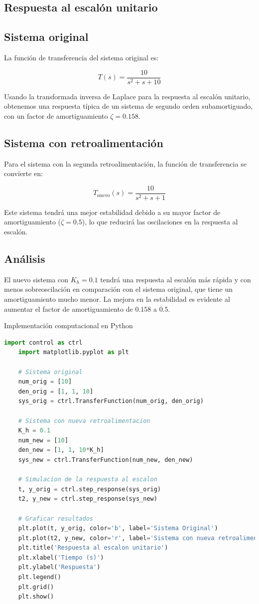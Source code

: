 \documentclass[10pt]{article}
\theoremstyle{definition}
\theoremstyle{remark}
\theoremstyle{definition}
\numberwithin{equation}{prob}
\begin{document}
\subsection{Respuesta al escalón unitario}

\subsection*{Sistema original}

La función de transferencia del sistema original es:

\[
	T(s) = \frac{10}{s^2 + s + 10}
\]

Usando la transformada inversa de Laplace para la respuesta al escalón unitario, obtenemos una respuesta típica de un sistema de segundo orden subamortiguado, con un factor de amortiguamiento \(\zeta = 0.158\).

\subsection*{Sistema con retroalimentación}

Para el sistema con la segunda retroalimentación, la función de transferencia se convierte en:

\[
	T_{\text{nuevo}}(s) = \frac{10}{s^2 + s + 1}
\]

Este sistema tendrá una mejor estabilidad debido a su mayor factor de amortiguamiento (\(\zeta = 0.5\)), lo que reducirá las oscilaciones en la respuesta al escalón.

\subsection*{Análisis}

El nuevo sistema con \(K_h = 0.1\) tendrá una respuesta al escalón más rápida y con menos sobreoscilación en comparación con el sistema original, que tiene un amortiguamiento mucho menor. La mejora en la estabilidad es evidente al aumentar el factor de amortiguamiento de \(0.158\) a \(0.5\).

Implementación computacional en Python
\begin{lstlisting}[language=Python]
	import control as ctrl
	import matplotlib.pyplot as plt
	
	# Sistema original
	num_orig = [10]
	den_orig = [1, 1, 10]
	sys_orig = ctrl.TransferFunction(num_orig, den_orig)
	
	# Sistema con nueva retroalimentacion
	K_h = 0.1
	num_new = [10]
	den_new = [1, 1, 10*K_h]
	sys_new = ctrl.TransferFunction(num_new, den_new)
	
	# Simulacion de la respuesta al escalon
	t, y_orig = ctrl.step_response(sys_orig)
	t2, y_new = ctrl.step_response(sys_new)

	# Graficar resultados
	plt.plot(t, y_orig, color='b', label='Sistema Original')
	plt.plot(t2, y_new, color='r', label='Sistema con nueva retroalimentacion')
	plt.title('Respuesta al escalon unitario')
	plt.xlabel('Tiempo (s)')
	plt.ylabel('Respuesta')
	plt.legend()
	plt.grid()
	plt.show()
\end{lstlisting}
\end{document}
